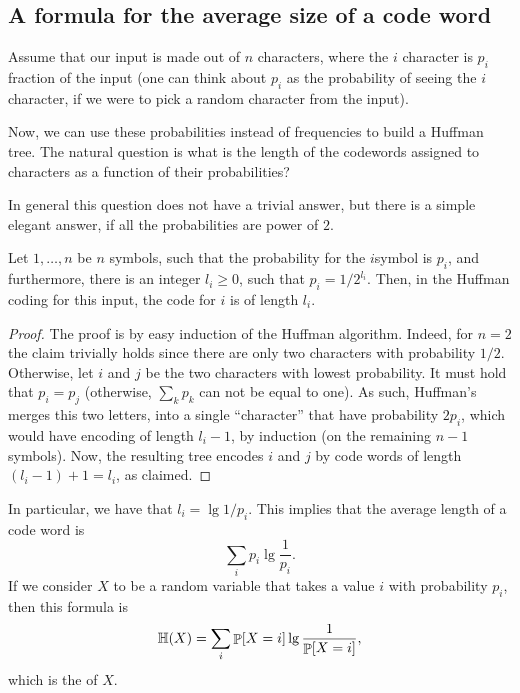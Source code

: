 \subsection{A formula for the average size of a code word}

Assume that our input is made out of $n$ characters, where the $i$\th
character is $p_i$ fraction of the input (one can think about $p_i$ as
the probability of seeing the $i$\th character, if we were to pick a
random character from the input).

Now, we can use these probabilities instead of frequencies to build a
Huffman tree. The natural question is what is the length of the
codewords assigned to characters as a function of their probabilities?

In general this question does not have a trivial answer, but there is
a simple elegant answer, if all the probabilities are power of $2$. 

\begin{lemma}
    Let $1, \ldots, n$ be $n$ symbols, such that the probability for
    the $i$\th symbol is $p_i$, and furthermore, there is an integer
    $l_i\geq 0 $, such that $p_i = 1/2^{l_i}$. Then, in the Huffman
    coding for this input, the code for $i$ is of length $l_i$.
\end{lemma}
\begin{proof}
    The proof is by easy induction of the Huffman algorithm. Indeed,
    for $n=2$ the claim trivially holds since there are only two
    characters with probability $1/2$. Otherwise, let $i$ and $j$ be
    the two characters with lowest probability. It must hold that $p_i
    = p_j$ (otherwise, $\sum_k p_k$ can not be equal to one). As such,
    Huffman's merges this two letters, into a single ``character''
    that have probability $2p_i$, which would have encoding of length
    $l_i-1$, by induction (on the remaining $n-1$ symbols). Now, the
    resulting tree encodes $i$ and $j$ by code words of length $(l_i
    -1 )+ 1 = l_i$, as claimed.
\end{proof}

In particular, we have that $l_i = \lg 1/p_i$. This implies that the
average length of a code word is 
\begin{equation*}
\sum_i p_i \lg \frac{1}{p_i}. 
\end{equation*}
If we consider $X$ to be a random variable that takes a value $i$ with
probability $p_i$, then this formula is
\begin{equation*}
\Entropy{X} = \sum_i \Prob{X = i} \lg \frac{1}{\Prob{X = i}},
\end{equation*}
which is the  of $X$.

